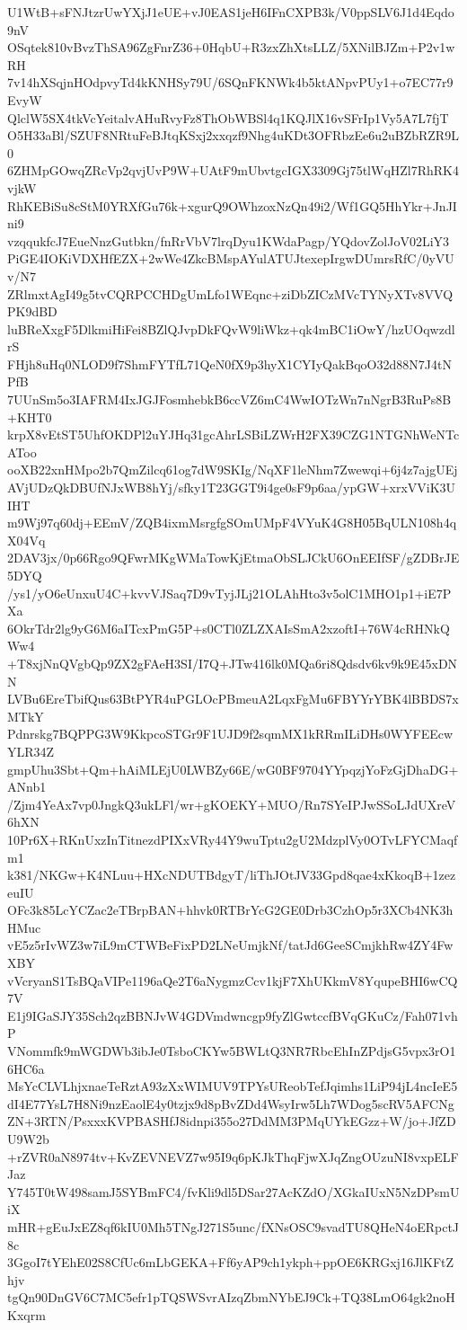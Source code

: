 U1WtB+sFNJtzrUwYXjJ1eUE+vJ0EAS1jeH6IFnCXPB3k/V0ppSLV6J1d4Eqdo9nV
OSqtek810vBvzThSA96ZgFnrZ36+0HqbU+R3zxZhXtsLLZ/5XNilBJZm+P2v1wRH
7v14hXSqjnHOdpvyTd4kKNHSy79U/6SQnFKNWk4b5ktANpvPUy1+o7EC77r9EvyW
QlclW5SX4tkVcYeitalvAHuRvyFz8ThObWBSl4q1KQJlX16vSFrIp1Vy5A7L7fjT
O5H33aBl/SZUF8NRtuFeBJtqKSxj2xxqzf9Nhg4uKDt3OFRbzEe6u2uBZbRZR9L0
6ZHMpGOwqZRcVp2qvjUvP9W+UAtF9mUbvtgcIGX3309Gj75tlWqHZl7RhRK4vjkW
RhKEBiSu8cStM0YRXfGu76k+xgurQ9OWhzoxNzQn49i2/Wf1GQ5HhYkr+JnJIni9
vzqqukfcJ7EueNnzGutbkn/fnRrVbV7lrqDyu1KWdaPagp/YQdovZolJoV02LiY3
PiGE4IOKiVDXHfEZX+2wWe4ZkcBMspAYulATUJtexepIrgwDUmrsRfC/0yVUv/N7
ZRlmxtAgI49g5tvCQRPCCHDgUmLfo1WEqnc+ziDbZICzMVcTYNyXTv8VVQPK9dBD
luBReXxgF5DlkmiHiFei8BZlQJvpDkFQvW9liWkz+qk4mBC1iOwY/hzUOqwzdlrS
FHjh8uHq0NLOD9f7ShmFYTfL71QeN0fX9p3hyX1CYIyQakBqoO32d88N7J4tNPfB
7UUnSm5o3IAFRM4IxJGJFosmhebkB6ccVZ6mC4WwIOTzWn7nNgrB3RuPs8B+KHT0
krpX8vEtST5UhfOKDPl2uYJHq31gcAhrLSBiLZWrH2FX39CZG1NTGNhWeNTcAToo
ooXB22xnHMpo2b7QmZilcq61og7dW9SKIg/NqXF1leNhm7Zwewqi+6j4z7ajgUEj
AVjUDzQkDBUfNJxWB8hYj/sfky1T23GGT9i4ge0sF9p6aa/ypGW+xrxVViK3UIHT
m9Wj97q60dj+EEmV/ZQB4ixmMsrgfgSOmUMpF4VYuK4G8H05BqULN108h4qX04Vq
2DAV3jx/0p66Rgo9QFwrMKgWMaTowKjEtmaObSLJCkU6OnEEIfSF/gZDBrJE5DYQ
/ys1/yO6eUnxuU4C+kvvVJSaq7D9vTyjJLj21OLAhHto3v5olC1MHO1p1+iE7PXa
6OkrTdr2lg9yG6M6aITcxPmG5P+s0CTl0ZLZXAIsSmA2xzoftI+76W4cRHNkQWw4
+T8xjNnQVgbQp9ZX2gFAeH3SI/I7Q+JTw416lk0MQa6ri8Qdsdv6kv9k9E45xDNN
LVBu6EreTbifQus63BtPYR4uPGLOcPBmeuA2LqxFgMu6FBYYrYBK4lBBDS7xMTkY
Pdnrskg7BQPPG3W9KkpcoSTGr9F1UJD9f2sqmMX1kRRmILiDHs0WYFEEcwYLR34Z
gmpUhu3Sbt+Qm+hAiMLEjU0LWBZy66E/wG0BF9704YYpqzjYoFzGjDhaDG+ANnb1
/Zjm4YeAx7vp0JngkQ3ukLFl/wr+gKOEKY+MUO/Rn7SYeIPJwSSoLJdUXreV6hXN
10Pr6X+RKnUxzInTitnezdPIXxVRy44Y9wuTptu2gU2MdzplVy0OTvLFYCMaqfm1
k381/NKGw+K4NLuu+HXcNDUTBdgyT/liThJOtJV33Gpd8qae4xKkoqB+1zezeuIU
OFc3k85LcYCZac2eTBrpBAN+hhvk0RTBrYcG2GE0Drb3CzhOp5r3XCb4NK3hHMuc
vE5z5rIvWZ3w7iL9mCTWBeFixPD2LNeUmjkNf/tatJd6GeeSCmjkhRw4ZY4FwXBY
vVcryanS1TsBQaVIPe1196aQe2T6aNygmzCcv1kjF7XhUKkmV8YqupeBHI6wCQ7V
E1j9IGaSJY35Sch2qzBBNJvW4GDVmdwncgp9fyZlGwtccfBVqGKuCz/Fah071vhP
VNommfk9mWGDWb3ibJe0TsboCKYw5BWLtQ3NR7RbcEhInZPdjsG5vpx3rO16HC6a
MsYcCLVLhjxnaeTeRztA93zXxWIMUV9TPYsUReobTefJqimhs1LiP94jL4ncIeE5
dI4E77YsL7H8Ni9nzEaolE4y0tzjx9d8pBvZDd4WsyIrw5Lh7WDog5scRV5AFCNg
ZN+3RTN/PsxxxKVPBASHfJ8idnpi355o27DdMM3PMqUYkEGzz+W/jo+JfZDU9W2b
+rZVR0aN8974tv+KvZEVNEVZ7w95I9q6pKJkThqFjwXJqZngOUzuNI8vxpELFJaz
Y745T0tW498samJ5SYBmFC4/fvKli9dl5DSar27AcKZdO/XGkaIUxN5NzDPsmUiX
mHR+gEuJxEZ8qf6kIU0Mh5TNgJ271S5unc/fXNsOSC9svadTU8QHeN4oERpctJ8c
3GgoI7tYEhE02S8CfUc6mLbGEKA+Ff6yAP9ch1ykph+ppOE6KRGxj16JlKFtZhjv
tgQn90DnGV6C7MC5efr1pTQSWSvrAIzqZbmNYbEJ9Ck+TQ38LmO64gk2noHKxqrm
